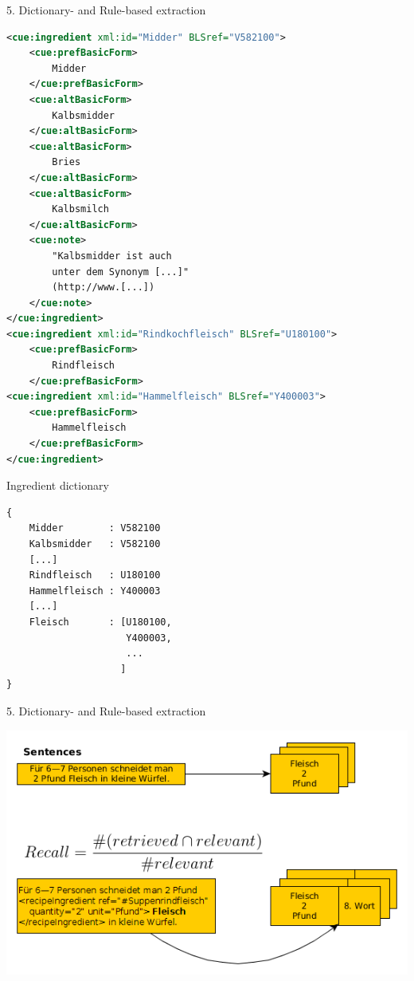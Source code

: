 \documentclass[12pt]{beamer}
\begin{document}
\begin{frame}[fragile]{5. Dictionary- and Rule-based extraction}
	\begin{minipage}{0.4\textwidth}
		\begin{lstlisting}[language=XML, caption={Auszug aus cue:listIngredients}]
<cue:ingredient xml:id="Midder" BLSref="V582100">
	<cue:prefBasicForm>
		Midder
	</cue:prefBasicForm>
	<cue:altBasicForm>
		Kalbsmidder
	</cue:altBasicForm>
	<cue:altBasicForm>
		Bries
	</cue:altBasicForm>
	<cue:altBasicForm>
		Kalbsmilch
	</cue:altBasicForm>
	<cue:note>
		"Kalbsmidder ist auch
		unter dem Synonym [...]"
		(http://www.[...])
	</cue:note>
</cue:ingredient>
<cue:ingredient xml:id="Rindkochfleisch" BLSref="U180100">
	<cue:prefBasicForm>
		Rindfleisch
	</cue:prefBasicForm>
<cue:ingredient xml:id="Hammelfleisch" BLSref="Y400003">
	<cue:prefBasicForm>
		Hammelfleisch
	</cue:prefBasicForm>
</cue:ingredient>
		\end{lstlisting}
	\end{minipage}
	\hspace*{0.2cm}\begin{minipage}{0.57\textwidth}
		\vspace{-1cm}\begin{center}Ingredient dictionary\end{center}\vspace{-0.5cm}
		\begin{lstlisting}
{
	Midder        : V582100
	Kalbsmidder   : V582100
	[...]
	Rindfleisch   : U180100
	Hammelfleisch : Y400003
	[...]
	Fleisch       : [U180100,
	                 Y400003,
	                 ...
	                ]
}
		\end{lstlisting}
	\end{minipage}
\end{frame}

\begin{frame}{5. Dictionary- and Rule-based extraction}
	\begin{center}
		\includegraphics[width=1\linewidth, height=\textheight,keepaspectratio]{../../Images/recall}
	\end{center}
\end{frame}
\end{document}

